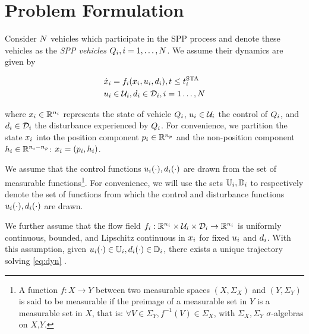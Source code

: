 \section{Problem Formulation \label{sec:formulation}}
Consider $N$ vehicles which participate in the SPP process and denote these vehicles as the \textit{SPP vehicles} $Q_i, i = 1, \ldots, N$. We assume their dynamics are given by

\begin{equation}
\label{eq:dyn}
\begin{aligned}
\dot\state_i &= \fdyn_i(\state_i, \ctrl_i, \dstb_i), t \le \sta_i \\
\ctrl_i &\in \cset_i, \dstb_i \in \dset_i, i = 1 \ldots, \N
\end{aligned}
\end{equation}

\noindent where $x_i \in \mathbb{R}^{n_i}$ represents the state of vehicle $Q_i$, $u_i \in \mathcal{U}_i$ the control of $Q_i$, and $d_i \in \mathcal{D}_i$ the disturbance experienced by $Q_i$. For convenience, we partition the state $x_i$ into the position component $p_i \in \mathbb{R}^{n_p}$ and the non-position component $h_i \in \mathbb{R}^{n_i - n_p}$: $x_i = (p_i, h_i)$.

We assume that the control functions $u_i(\cdot), d_i(\cdot)$ are drawn from the set of measurable functions\footnote{A function $f:X\to Y$ between two measurable spaces $(X,\Sigma_X)$ and $(Y,\Sigma_Y)$ is said to be measurable if the preimage of a measurable set in $Y$ is a measurable set in $X$, that is: $\forall V\in\Sigma_Y, f^{-1}(V)\in\Sigma_X$, with $\Sigma_X,\Sigma_Y$ $\sigma$-algebras on $X$,$Y$.}. For convenience, we will use the sets $\mathbb{U}_i, \mathbb{D}_i$ to respectively denote the set of functions from which the control and disturbance functions $u_i(\cdot), d_i(\cdot)$ are drawn.

We further assume that the flow field $f_i: \mathbb{R}^{n_i}\times\mathcal{U}_i\times\mathcal{D}_i \rightarrow \mathbb{R}^{n_i}$ is uniformly continuous, bounded, and Lipschitz continuous in $x_i$ for fixed $u_i$ and $d_i$. With this assumption, given $u_i(\cdot) \in \mathbb{U}_i, d_i(\cdot) \in \mathbb{D}_i$, there exists a unique trajectory solving \eqref{eq:dyn} \cite{EarlA.Coddington1955}. %

